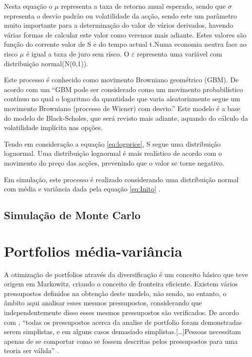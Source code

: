 \documentclass[
  12pt,
  a4paper,
  openany]{book}
\begin{document}
Nesta equação o \(\mu\) representa a taxa de retorno anual esperado, sendo que \(\sigma\) representa o desvio padrão ou volatilidade da acção, sendo este um parâmetro muito importante para a determinação do valor de vários derivados, havendo várias formas de calcular este valor como veremos mais adiante. Estes valores são função do corrente valor de S e do tempo actual t.Numa economia neutra face ao risco \(\mu\) é igual a taxa de juro sem risco. O \(\varepsilon\) representa uma variável com distribuição normal(N(0,1)).

Este processo é conhecido como movimento Browniano geométrico (GBM). De acordo com \citet{AppliedFinancial} um ``GBM pode ser considerado como um movimento probabilístico contínuo no qual o logaritmo da quantidade que varia aleatoriamente segue um movimento Browniano (processo de Wiener) com desvio.'' Este modelo é a base do modelo de Black-Scholes, que será revisto mais adiante, aquando do cálculo da volatilidade implícita nas opções.

Tendo em consideração a equação \eqref{eq:logprice}, S segue uma distribuição lognormal. Uma distribuição lognormal é mais realístico de acordo com o movimento do preço das acções, prevenindo que o valor se torne negativo.

Em simulação, este processo é realizado considerando uma distribuição normal com média e variância dada pela equação \eqref{eq:Inito} \citep{FRM1}.

\hypertarget{simulauxe7uxe3o-de-monte-carlo}{%
\subsection{Simulação de Monte Carlo}\label{simulauxe7uxe3o-de-monte-carlo}}

\hypertarget{portfolios-muxe9dia-variuxe2ncia}{%
\section{Portfolios média-variância}\label{portfolios-muxe9dia-variuxe2ncia}}

A otimização de portfolios através da diversificação é um conceito básico que teve origem em Markowitz, criando o conceito de fronteira eficiente. Existem vários pressupostos definidos na obtenção deste modelo, não sendo, no entanto, o âmbito aqui analisar esses mesmos pressupostos, considerando que independentemente disso esses mesmos pressupostos são verificados. De acordo com \citet{Modern2013}, ``todas os pressupostos acerca da analise de portfolio foram demonstradas serem simplistas, e em alguns casos demasiado simplistas.{[}\ldots{]}Pessoas necessitam apenas de se comportar como se fossem descritas pelos pressupostos para uma teoria ser válida'' \citep[pp.5]{Modern2013}.
\end{document}
